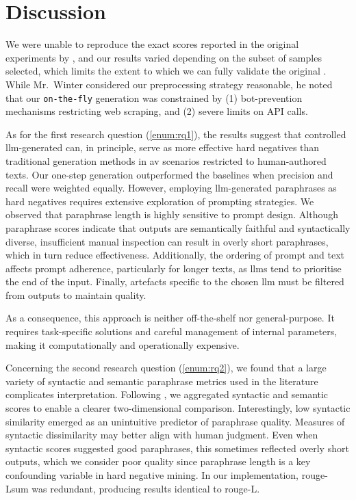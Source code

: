\chapter{Discussion}
\label{chap:discussion}

We were unable to reproduce the exact scores reported in the original experiments by \citet{koppel_determining_2014}, and our results varied depending on the subset of samples selected, 
which limits the extent to which we can fully validate the original \impAppr{}. 
While Mr.~Winter considered our preprocessing strategy reasonable, he noted that our \texttt{on-the-fly} \imp{} generation was constrained by (1) bot-prevention mechanisms restricting web scraping, and (2) severe limits on API calls.  

As for the first research question (\ref{enum:rq1}), the results suggest that controlled \ac{llm}-generated \imps{} can, in principle, serve as more effective hard negatives than traditional \imp{} generation methods in \ac{av} scenarios restricted to human-authored texts. 
Our one-step \imp{} generation outperformed the baselines when precision and recall were weighted equally.  
However, employing \ac{llm}-generated paraphrases as hard negatives requires extensive exploration of prompting strategies.  
We observed that paraphrase length is highly sensitive to prompt design. 
Although paraphrase scores indicate that outputs are semantically faithful and syntactically diverse, insufficient manual inspection can result in overly short paraphrases, which in turn reduce \impAppr{} effectiveness.  
Additionally, the ordering of prompt and text affects prompt adherence, particularly for longer texts, as \acp{llm} tend to prioritise the end of the input.  
Finally, artefacts specific to the chosen \ac{llm} must be filtered from outputs to maintain quality. 

As a consequence, this approach is neither off-the-shelf nor general-purpose. 
It requires task-specific solutions and careful management of internal parameters, making it computationally and operationally expensive.


Concerning the second research question (\ref{enum:rq2}), we found that a large variety of syntactic and semantic paraphrase metrics used in the literature complicates interpretation. 
Following \citet{gohsen_captions_2023}, we aggregated syntactic and semantic scores to enable a clearer two-dimensional comparison.  
Interestingly, low syntactic similarity emerged as an unintuitive predictor of paraphrase quality. 
Measures of syntactic dissimilarity may better align with human judgment.  
Even when syntactic scores suggested good paraphrases, this sometimes reflected overly short outputs, which we consider poor quality since paraphrase length is a key confounding variable in hard negative mining.  
In our implementation, \ac{rouge}-Lsum was redundant, producing results identical to \ac{rouge}-L.  

